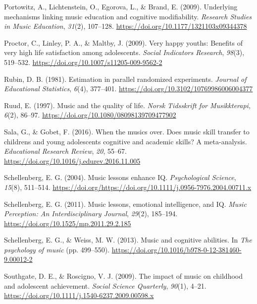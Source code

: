 \documentclass[a4, 12pt]{article}
\begin{document}
\leavevmode\hypertarget{ref-Portowitz2009}{}%
Portowitz, A., Lichtenstein, O., Egorova, L., \& Brand, E. (2009). Underlying mechanisms linking music education and cognitive modifiability. \emph{Research Studies in Music Education}, \emph{31}(2), 107--128. \url{https://doi.org/10.1177/1321103x09344378}

\leavevmode\hypertarget{ref-Proctor2009a}{}%
Proctor, C., Linley, P. A., \& Maltby, J. (2009). Very happy youths: Benefits of very high life satisfaction among adolescents. \emph{Social Indicators Research}, \emph{98}(3), 519--532. \url{https://doi.org/10.1007/s11205-009-9562-2}

\leavevmode\hypertarget{ref-Rubin1981}{}%
Rubin, D. B. (1981). Estimation in parallel randomized experiments. \emph{Journal of Educational Statistics}, \emph{6}(4), 377--401. \url{https://doi.org/10.3102/10769986006004377}

\leavevmode\hypertarget{ref-Ruud1997}{}%
Ruud, E. (1997). Music and the quality of life. \emph{Norsk Tidsskrift for Musikkterapi}, \emph{6}(2), 86--97. \url{https://doi.org/10.1080/08098139709477902}

\leavevmode\hypertarget{ref-Sala2016}{}%
Sala, G., \& Gobet, F. (2016). When the musics over. Does music skill transfer to childrens and young adolescents cognitive and academic skills? A meta-analysis. \emph{Educational Research Review}, \emph{20}, 55--67. \url{https://doi.org/10.1016/j.edurev.2016.11.005}

\leavevmode\hypertarget{ref-Schellenberg2004}{}%
Schellenberg, E. G. (2004). Music lessons enhance IQ. \emph{Psychological Science}, \emph{15}(8), 511--514. \url{https://doi.org/https://doi.org/10.1111/j.0956-7976.2004.00711.x}

\leavevmode\hypertarget{ref-Schellenberg2011a}{}%
Schellenberg, E. G. (2011). Music lessons, emotional intelligence, and IQ. \emph{Music Perception: An Interdisciplinary Journal}, \emph{29}(2), 185--194. \url{https://doi.org/10.1525/mp.2011.29.2.185}

\leavevmode\hypertarget{ref-Schellenberg2013}{}%
Schellenberg, E. G., \& Weiss, M. W. (2013). Music and cognitive abilities. In \emph{The psychology of music} (pp. 499--550). \url{https://doi.org/10.1016/b978-0-12-381460-9.00012-2}

\leavevmode\hypertarget{ref-Southgate2009}{}%
Southgate, D. E., \& Roscigno, V. J. (2009). The impact of music on childhood and adolescent achievement. \emph{Social Science Quarterly}, \emph{90}(1), 4--21. \url{https://doi.org/10.1111/j.1540-6237.2009.00598.x}
\end{document}
